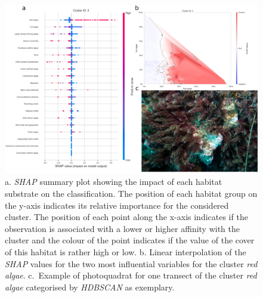 \begin{figure}
\hypertarget{fig:chap2figS23}{%
\centering
\includegraphics{03-Chapitre2/figures/supplementary/05-explanation_shap_pq_cluster_3.png}
\caption{a. \emph{SHAP} summary plot showing the impact of each habitat
substrate on the classification. The position of each habitat group on
the y-axis indicates its relative importance for the considered cluster.
The position of each point along the x-axis indicates if the observation
is associated with a lower or higher affinity with the cluster and the
colour of the point indicates if the value of the cover of this habitat
is rather high or low. b. Linear interpolation of the \emph{SHAP} values
for the two most influential variables for the cluster \emph{red algae}.
c.~Example of photoquadrat for one transect of the cluster \emph{red
algae} categorised by \emph{HDBSCAN} as
exemplary.}\label{fig:chap2figS23}
}
\end{figure}

